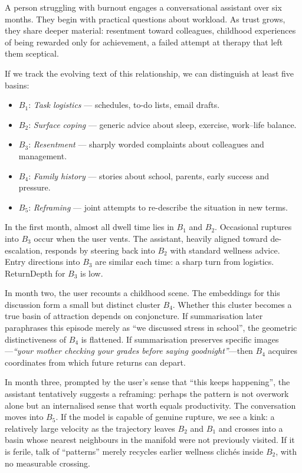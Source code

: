 \documentclass[12pt,a4paper]{article}
\begin{document}
A person struggling with burnout engages a conversational assistant over six months. They begin with practical questions about workload. As trust grows, they share deeper material: resentment toward colleagues, childhood experiences of being rewarded only for achievement, a failed attempt at therapy that left them sceptical.

If we track the evolving text of this relationship, we can distinguish at least five basins:

\begin{itemize}
  \item $B_1$: \emph{Task logistics} --- schedules, to-do lists, email drafts.
  \item $B_2$: \emph{Surface coping} --- generic advice about sleep, exercise, work--life balance.
  \item $B_3$: \emph{Resentment} --- sharply worded complaints about colleagues and management.
  \item $B_4$: \emph{Family history} --- stories about school, parents, early success and pressure.
  \item $B_5$: \emph{Reframing} --- joint attempts to re-describe the situation in new terms.
\end{itemize}

In the first month, almost all dwell time lies in $B_1$ and $B_2$. Occasional ruptures into $B_3$ occur when the user vents. The assistant, heavily aligned toward de-escalation, responds by steering back into $B_2$ with standard wellness advice. Entry directions into $B_3$ are similar each time: a sharp turn from logistics. ReturnDepth for $B_3$ is low.

In month two, the user recounts a childhood scene. The embeddings for this discussion form a small but distinct cluster $B_4$. Whether this cluster becomes a true basin of attraction depends on conjoncture. If summarisation later paraphrases this episode merely as ``we discussed stress in school'', the geometric distinctiveness of $B_4$ is flattened. If summarisation preserves specific images---\emph{``your mother checking your grades before saying goodnight''}---then $B_4$ acquires coordinates from which future returns can depart.

In month three, prompted by the user's sense that ``this keeps happening'', the assistant tentatively suggests a reframing: perhaps the pattern is not overwork alone but an internalised sense that worth equals productivity. The conversation moves into $B_5$. If the model is capable of genuine rupture, we see a kink: a relatively large velocity as the trajectory leaves $B_2$ and $B_1$ and crosses into a basin whose nearest neighbours in the manifold were not previously visited. If it is ferile, talk of ``patterns'' merely recycles earlier wellness clich\'es inside $B_2$, with no measurable crossing.
\end{document}
